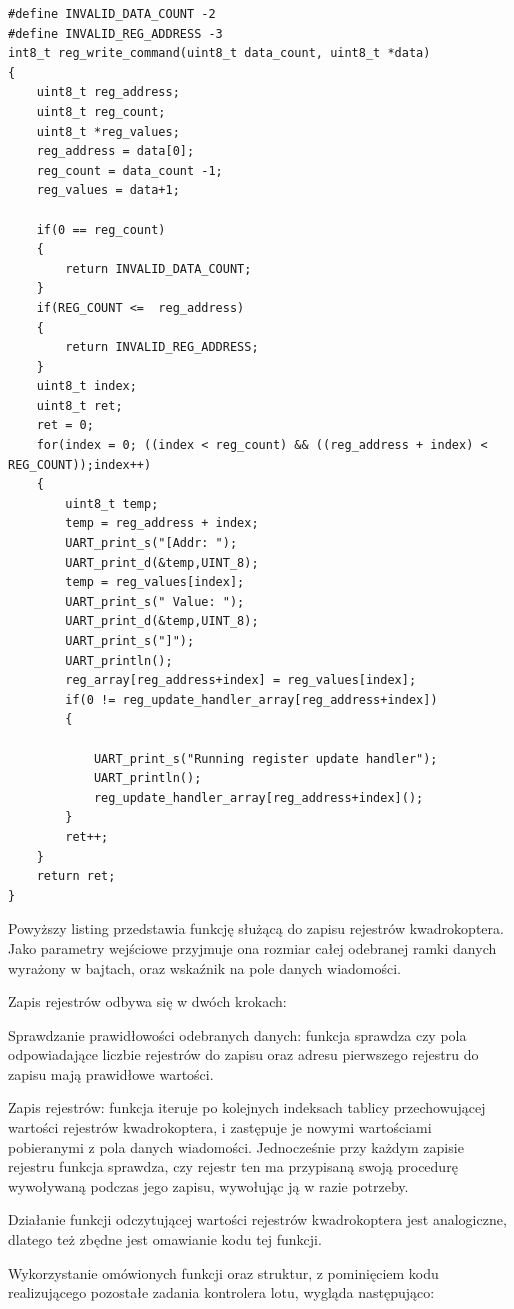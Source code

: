 \begin{lstlisting}
#define INVALID_DATA_COUNT -2
#define INVALID_REG_ADDRESS -3
int8_t reg_write_command(uint8_t data_count, uint8_t *data)
{
	uint8_t reg_address;
	uint8_t reg_count;
	uint8_t *reg_values;
	reg_address = data[0];
	reg_count = data_count -1;
	reg_values = data+1;

	if(0 == reg_count)
	{
		return INVALID_DATA_COUNT;
	}
	if(REG_COUNT <=  reg_address)
	{
		return INVALID_REG_ADDRESS;
	}
	uint8_t index;
	uint8_t ret;
	ret = 0;
	for(index = 0; ((index < reg_count) && ((reg_address + index) < REG_COUNT));index++)
	{
		uint8_t temp;
		temp = reg_address + index;
		UART_print_s("[Addr: ");
		UART_print_d(&temp,UINT_8);
		temp = reg_values[index];
		UART_print_s(" Value: ");
		UART_print_d(&temp,UINT_8);
		UART_print_s("]");
		UART_println();
		reg_array[reg_address+index] = reg_values[index];
		if(0 != reg_update_handler_array[reg_address+index])
		{

			UART_print_s("Running register update handler");
			UART_println();
			reg_update_handler_array[reg_address+index]();
		}
		ret++;
	} 
	return ret;
}
\end{lstlisting}

Powyższy listing przedstawia funkcję służącą do zapisu rejestrów kwadrokoptera. Jako parametry wejściowe przyjmuje ona rozmiar całej odebranej ramki danych wyrażony w bajtach, oraz wskaźnik na pole danych wiadomości.

Zapis rejestrów odbywa się w dwóch krokach:

Sprawdzanie prawidłowości odebranych danych: funkcja sprawdza czy pola odpowiadające liczbie rejestrów do zapisu oraz adresu pierwszego rejestru do zapisu mają prawidłowe wartości.

Zapis rejestrów: funkcja iteruje po kolejnych indeksach tablicy przechowującej wartości rejestrów kwadrokoptera, i zastępuje je nowymi wartościami pobieranymi z pola danych wiadomości. Jednocześnie przy każdym zapisie rejestru funkcja sprawdza, czy rejestr ten ma przypisaną swoją procedurę wywoływaną podczas jego zapisu, wywołując ją w razie potrzeby.

Działanie funkcji odczytującej wartości rejestrów kwadrokoptera jest analogiczne, dlatego też zbędne jest omawianie kodu tej funkcji.

Wykorzystanie omówionych funkcji oraz struktur, z pominięciem kodu realizującego pozostałe zadania kontrolera lotu, wygląda następująco:

